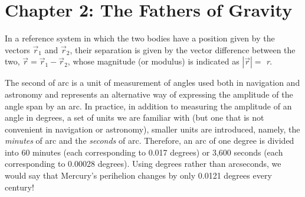 \section*{Chapter 2: The Fathers of Gravity}
\begin{description}[style=multiline,leftmargin=2em,labelwidth=1.5em]

\item[1.]\hypertarget{note:02-01}{}In a reference system in which the two bodies have a
position given by the vectors \({\overrightarrow{r}}_{1}\) and
\({\overrightarrow{r}}_{2}\), their separation is given by the vector difference between
the two, \({\overrightarrow{r} = \overrightarrow{r}}_{1} - {\overrightarrow{r}}_{2}\),
whose magnitude (or modulus) is indicated as \(\left| \overrightarrow{r} \right| =\)
\emph{r}.

\item[2.]\hypertarget{note:02-02}{}The second of arc is a unit of measurement of angles
used both in navigation and astronomy and represents an alternative way of expressing
the amplitude of the angle span by an arc. In practice, in addition to measuring the
amplitude of an angle in degrees, a set of units we are familiar with (but one that is
not convenient in navigation or astronomy), smaller units are introduced, namely, the
\emph{minutes} of arc and the \emph{seconds} of arc. Therefore, an arc of one degree is
divided into 60 minutes (each corresponding to 0.017 degrees) or 3,600 seconds (each
corresponding to 0.00028 degrees). Using degrees rather than arcseconds, we would say
that Mercury's perihelion changes by only 0.0121 degrees every
century!

\end{description}
